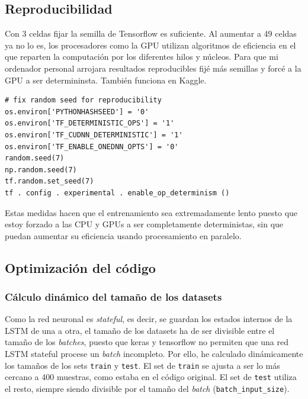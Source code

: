 \documentclass{article}
\begin{document}
\subsection{Reproducibilidad}
Con 3 celdas fijar la semilla de Tensorflow es suficiente. Al aumentar a 49 celdas ya no lo es, los procesadores como la GPU utilizan algoritmos de eficiencia en el que reparten la computación por los diferentes hilos y núcleos. Para que mi ordenador personal arrojara resultados reproducibles fijé más semillas y forcé a la GPU a ser determininsta. También funciona en Kaggle.

\begin{lstlisting}[style=pythonstyle, caption={Código para la reproducibilidad}]
# fix random seed for reproducibility
os.environ['PYTHONHASHSEED'] = '0'
os.environ['TF_DETERMINISTIC_OPS'] = '1'
os.environ['TF_CUDNN_DETERMINISTIC'] = '1'
os.environ['TF_ENABLE_ONEDNN_OPTS'] = '0'
random.seed(7)
np.random.seed(7)
tf.random.set_seed(7)
tf . config . experimental . enable_op_determinism ()
\end{lstlisting}

Estas medidas hacen que el entrenamiento sea extremadamente lento puesto que estoy forzado a
las CPU y GPUs a ser completamente deterministas, sin que puedan aumentar su eficiencia usando
procesamiento en paralelo.


\subsection{Optimización del código}

\subsubsection{Cálculo dinámico del tamaño de los datasets}
Como la red neuronal es \textit{stateful}, es decir, se guardan los estados internos de la LSTM de una a otra, el tamaño de los datasets ha de ser divisible entre el tamaño de los \textit{batches}, puesto que keras y tensorflow no permiten que una red LSTM stateful procese un \textit{batch} incompleto. Por ello, he calculado dinámicamente los tamaños de los sets \texttt{train} y \texttt{test}. El set de \texttt{train} se ajusta a ser lo más cercano a 400 muestras, como estaba en el código original. El set de \texttt{test} utiliza el resto, siempre siendo divisible por el tamaño del \textit{batch} (\texttt{batch\_input\_size}).
\end{document}
